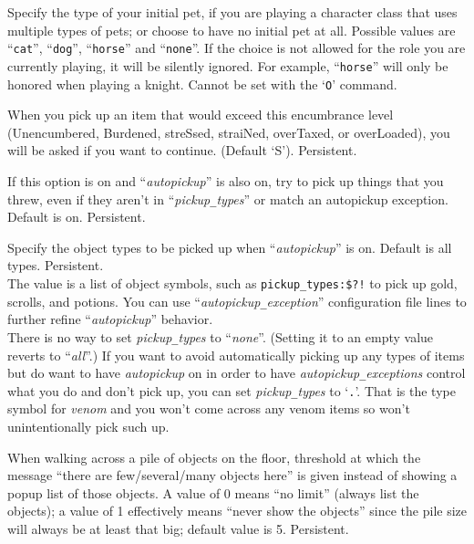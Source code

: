 \item[\ib{pettype}]
Specify the type of your initial pet, if you are playing a character class
that uses multiple types of pets; or choose to have no initial pet at all.
Possible values are ``{\tt cat}'', ``{\tt dog}'', ``{\tt horse}''
and ``{\tt none}''.
If the choice is not allowed for the role you are currently playing,
it will be silently ignored.  For example, ``{\tt horse}'' will only be
honored when playing a knight.
Cannot be set with the `{\tt O}' command.
\item[\ib{pickup\verb+_+burden}]
When you pick up an item that would exceed this encumbrance
level (Unencumbered, Burdened, streSsed, straiNed, overTaxed,
or overLoaded), you will be asked if you want to continue.
(Default `S').  Persistent.
\item[\ib{pickup\verb+_+thrown}]
If this option is on and ``{\it autopickup\/}'' is also on, try to pick up
things that you threw, even if they aren't in
``{\it pickup\verb+_+types\/}'' or
match an autopickup exception.
Default is on.
Persistent.
\item[\ib{pickup\verb+_+types}]
Specify the object types to be picked up when ``{\it autopickup\/}''
is on.
Default is all types.
Persistent.
\\
The value is a list of object symbols, such as
{\tt \verb&pickup_types:$?!&} to pick up gold, scrolls, and potions.
You can use
``{\it autopickup\verb+_+exception\/}''
configuration file lines to further refine ``{\it autopickup\/}'' behavior.
\\
There is no way to set {\it pickup\verb+_+types\/} to ``{\it none}''.
(Setting it to an empty value reverts to ``{\it all}''.)
If you want to avoid automatically picking up any types of items but do
want to have {\it autopickup\/} on in order to have
{\it autopickup\verb+_+exceptions\/} control what you do and don't pick
up, you can set {\it pickup\verb+_+types\/} to `{\tt .}'.
That is the type symbol for {\it venom\/} and you won't come across
any venom items so won't unintentionally pick such up.
\item[\ib{pile\verb+_+limit}]
When walking across a pile of objects on the floor, threshold at which
the message ``there are few/several/many objects here'' is given instead
of showing a popup list of those objects.  A value of 0 means ``no limit''
(always list the objects); a value of 1 effectively means ``never show
the objects'' since the pile size will always be at least that big;
default value is 5.  Persistent.
